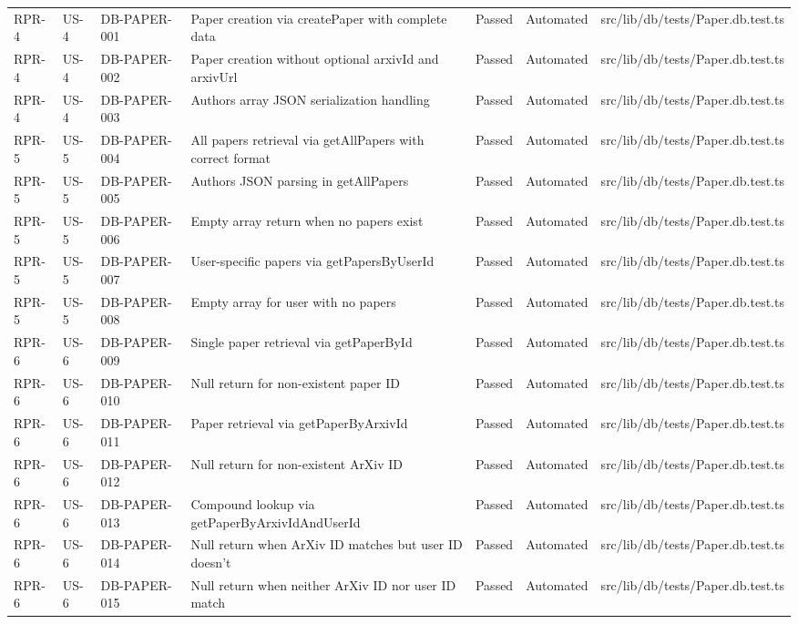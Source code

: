 \documentclass[12pt]{article}
\begin{document}
\begin{longtable}{|l|l|l|l|l|l|l|}
  \hline
  RPR-4 & US-4 & DB-PAPER-001 & Paper creation via createPaper with complete data & Passed & Automated & src/lib/db/tests/Paper.db.test.ts \\
  RPR-4 & US-4 & DB-PAPER-002 & Paper creation without optional arxivId and arxivUrl & Passed & Automated & src/lib/db/tests/Paper.db.test.ts \\
  RPR-4 & US-4 & DB-PAPER-003 & Authors array JSON serialization handling & Passed & Automated & src/lib/db/tests/Paper.db.test.ts \\
  RPR-5 & US-5 & DB-PAPER-004 & All papers retrieval via getAllPapers with correct format & Passed & Automated & src/lib/db/tests/Paper.db.test.ts \\
  RPR-5 & US-5 & DB-PAPER-005 & Authors JSON parsing in getAllPapers & Passed & Automated & src/lib/db/tests/Paper.db.test.ts \\
  RPR-5 & US-5 & DB-PAPER-006 & Empty array return when no papers exist & Passed & Automated & src/lib/db/tests/Paper.db.test.ts \\
  RPR-5 & US-5 & DB-PAPER-007 & User-specific papers via getPapersByUserId & Passed & Automated & src/lib/db/tests/Paper.db.test.ts \\
  RPR-5 & US-5 & DB-PAPER-008 & Empty array for user with no papers & Passed & Automated & src/lib/db/tests/Paper.db.test.ts \\
  RPR-6 & US-6 & DB-PAPER-009 & Single paper retrieval via getPaperById & Passed & Automated & src/lib/db/tests/Paper.db.test.ts \\
  RPR-6 & US-6 & DB-PAPER-010 & Null return for non-existent paper ID & Passed & Automated & src/lib/db/tests/Paper.db.test.ts \\
  RPR-6 & US-6 & DB-PAPER-011 & Paper retrieval via getPaperByArxivId & Passed & Automated & src/lib/db/tests/Paper.db.test.ts \\
  RPR-6 & US-6 & DB-PAPER-012 & Null return for non-existent ArXiv ID & Passed & Automated & src/lib/db/tests/Paper.db.test.ts \\
  RPR-6 & US-6 & DB-PAPER-013 & Compound lookup via getPaperByArxivIdAndUserId & Passed & Automated & src/lib/db/tests/Paper.db.test.ts \\
  RPR-6 & US-6 & DB-PAPER-014 & Null return when ArXiv ID matches but user ID doesn't & Passed & Automated & src/lib/db/tests/Paper.db.test.ts \\
  RPR-6 & US-6 & DB-PAPER-015 & Null return when neither ArXiv ID nor user ID match & Passed & Automated & src/lib/db/tests/Paper.db.test.ts \\

\end{longtable}
\end{document}
